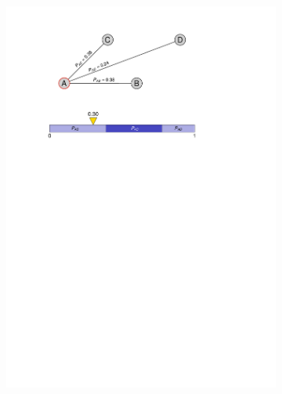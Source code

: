 \documentclass[pdftex,
               12pt,
               DIV=12,
               a4paper,
               twoside,
               parskip=half,
               abstract=true,
               dvipsnames]{scrartcl}
\begin{document}
\begin{figure}[ht]
	\centering
	\begin{subfigure}{0.45\textwidth}
		\includegraphics[width=\linewidth, page=1]{aco_probabilities}
		\caption{} \label{subfig:ACO_wahrscheinlichkeiten_a}
	\end{subfigure}
	\begin{subfigure}{0.45\textwidth}

\end{subfigure}
\end{figure}
\end{document}
